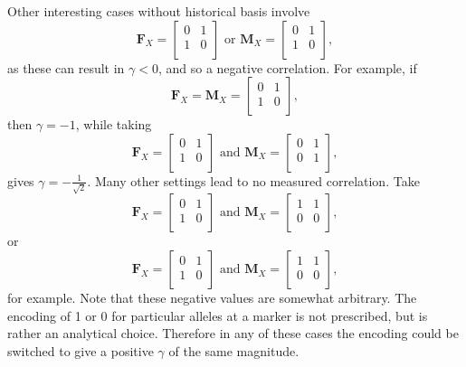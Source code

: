 \documentclass[sts]{imsart}
\newcommand{\m}[1]{\mathbf{#1}}               %
\begin{document}
Other interesting cases without historical basis involve
$$\m{F}_X = \begin{bmatrix}
  0 & 1 \\
  1 & 0 \\
\end{bmatrix} \text{ or } \m{M}_X = \begin{bmatrix}
  0 & 1 \\
  1 & 0 \\
\end{bmatrix},$$
as these can result in $\gamma < 0$, and so a negative correlation. For example, if
$$\m{F}_X = \m{M}_X = \begin{bmatrix}
  0 & 1 \\
  1 & 0 \\
\end{bmatrix},$$
then $\gamma = -1$, while taking
$$\m{F}_X = \begin{bmatrix}
  0 & 1 \\
  1 & 0 \\
\end{bmatrix} \text{ and } \m{M}_X = \begin{bmatrix}
  0 & 1 \\
  0 & 1 \\
\end{bmatrix},$$
gives $\gamma = -\frac{1}{\sqrt{2}}$. Many other settings lead to no measured correlation. Take
$$\m{F}_X = \begin{bmatrix}
  0 & 1 \\
  1 & 0 \\
\end{bmatrix} \text{ and } \m{M}_X = \begin{bmatrix}
  1 & 1 \\
  0 & 0 \\
\end{bmatrix},$$
or
$$\m{F}_X = \begin{bmatrix}
  0 & 1 \\
  1 & 0 \\
\end{bmatrix} \text{ and } \m{M}_X = \begin{bmatrix}
  1 & 1 \\
  0 & 0 \\
\end{bmatrix},$$
for example. Note that these negative values are somewhat arbitrary. The encoding of 1 or 0 for particular alleles at a marker is not prescribed, but is rather an analytical choice. Therefore in any of these cases the encoding could be switched to give a positive $\gamma$ of the same magnitude. 
\end{document}
